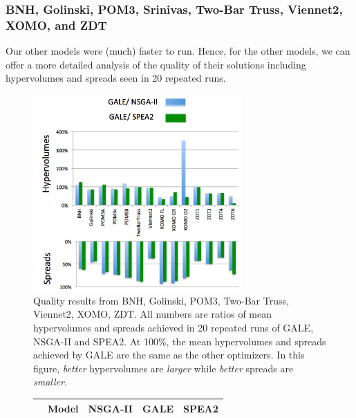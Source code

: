 \documentclass[10pt,journal,compsoc]{IEEEtran}
\newenvironment{changed}{\par\color{MyDarkBlue}}{\par}
\begin{document}
\begin{changed}
\subsubsection{BNH, Golinski, POM3, 
Srinivas, 
Two-Bar Truss, Viennet2, XOMO, and ZDT}

Our other models   were (much)
faster to run.  Hence, for  the other models, we
can offer a more detailed analysis of the quality of
their solutions including hypervolumes and spreads
seen in 20 repeated runs.
\begin{figure}
\includegraphics[width=3.15in]{mathsModelsResults.png}
\caption{Quality results from BNH, Golinski, POM3, Two-Bar Truss, Viennet2, XOMO, ZDT.
All numbers are ratios of mean hypervolumes and spreads achieved in 20 repeated runs of GALE, NSGA-II and SPEA2.
At 100\%, the mean hypervolumes and spreads achieved by GALE are the same as the other optimizers.
In this figure,  {\em better} hypervolumes are {\em larger} while {\em better} spreads are {\em smaller}.}\label{fig:rmodels}
\end{figure}
\begin{figure}[!t]
\scriptsize
\centering
\begin{tabular}{|r|c|c|c|c|} \hline
	&	Model	&	NSGA-II	&	GALE	&	SPEA2	\\ \hline

\end{tabular}
\end{figure}
\end{changed}
\end{document}
